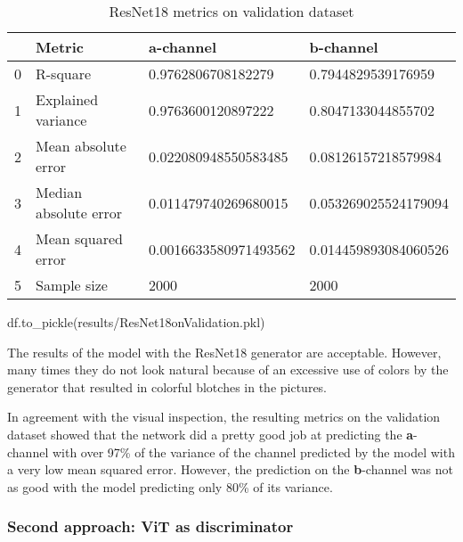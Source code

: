 \documentclass[
]{article}
\newenvironment{Shaded}{\begin{snugshade}}{\end{snugshade}}
\newcommand{\NormalTok}[1]{#1}
\newcommand{\StringTok}[1]{\textcolor[rgb]{0.31,0.60,0.02}{#1}}
\begin{document}
\begin{table}\centering\caption[Metrics of ResNet18 generator on validation dataset]{ResNet18 metrics on validation dataset}\begin{tabular}{llll}\toprule{} &                 Metric &              a-channel &             b-channel \\\midrule0 &               R-square &     0.9762806708182279 &    0.7944829539176959 \\1 &     Explained variance &     0.9763600120897222 &    0.8047133044855702 \\2 &    Mean absolute error &   0.022080948550583485 &   0.08126157218579984 \\3 &  Median absolute error &   0.011479740269680015 &  0.053269025524179094 \\4 &     Mean squared error &  0.0016633580971493562 &  0.014459893084060526 \\5 &            Sample size &                   2000 &                  2000 \\\bottomrule\end{tabular}\end{table}

\begin{Shaded}
\begin{Highlighting}[]
\NormalTok{df.to\_pickle(}\StringTok{\textquotesingle{}results/ResNet18onValidation.pkl\textquotesingle{}}\NormalTok{)}
\end{Highlighting}
\end{Shaded}

The results of the model with the ResNet18 generator are acceptable.
However, many times they do not look natural because of an excessive use
of colors by the generator that resulted in colorful blotches in the
pictures.

In agreement with the visual inspection, the resulting metrics on the
validation dataset showed that the network did a pretty good job at
predicting the \textbf{a}-channel with over 97\% of the variance of the
channel predicted by the model with a very low mean squared error.
However, the prediction on the \textbf{b}-channel was not as good with
the model predicting only 80\% of its variance.

\hypertarget{second-approach-vit-as-discriminator}{%
\subsubsection{Second approach: ViT as
discriminator}\label{second-approach-vit-as-discriminator}}
\end{document}
